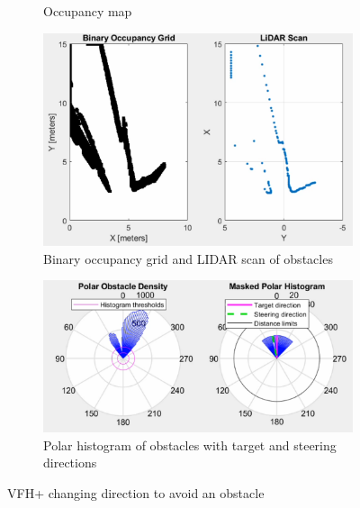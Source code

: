 \begin{figure}[p]
\begin{subfigure}{.2\textwidth}
        \caption{Occupancy map}
    \end{subfigure}
    \begin{subfigure}{.4\textwidth}
        \centering
        \includegraphics[width=\linewidth]{images/vfh_example_lidar.PNG}
        \caption{Binary occupancy grid and LIDAR scan of obstacles}
    \end{subfigure}
    \quad
    \begin{subfigure}{.55\textwidth}
        \centering
        \includegraphics[width=\linewidth]{images/vfh_example_hist.PNG}
        \caption{Polar histogram of obstacles with target and steering directions}
    \end{subfigure}
    \caption{VFH+ changing direction to avoid an obstacle}
    \label{fig:vfh_implementation}
\end{figure}

